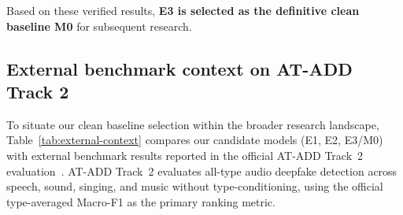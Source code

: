 Based on these verified results, \textbf{E3 is selected as the definitive clean baseline M0} for subsequent research.

\subsection{External benchmark context on AT-ADD Track 2}
\label{sec:external-context}

To situate our clean baseline selection within the broader research landscape, Table~\ref{tab:external-context} compares our candidate models (E1, E2, E3/M0) with external benchmark results reported in the official AT-ADD Track~2 evaluation~\cite{xie2026atadd}. AT-ADD Track~2 evaluates all-type audio deepfake detection across speech, sound, singing, and music without type-conditioning, using the official type-averaged Macro-F1 as the primary ranking metric.

